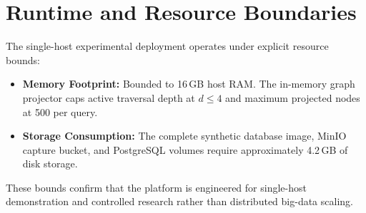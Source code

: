 \section{Runtime and Resource Boundaries}
\label{sec:exp-resource-boundaries}
The single-host experimental deployment operates under explicit resource bounds:
\begin{itemize}
    \item \textbf{Memory Footprint:} Bounded to 16\,GB host RAM. The in-memory graph projector caps active traversal depth at $d \le 4$ and maximum projected nodes at 500 per query.
    \item \textbf{Storage Consumption:} The complete synthetic database image, MinIO capture bucket, and PostgreSQL volumes require approximately 4.2\,GB of disk storage.
\end{itemize}
These bounds confirm that the platform is engineered for single-host demonstration and controlled research rather than distributed big-data scaling.
